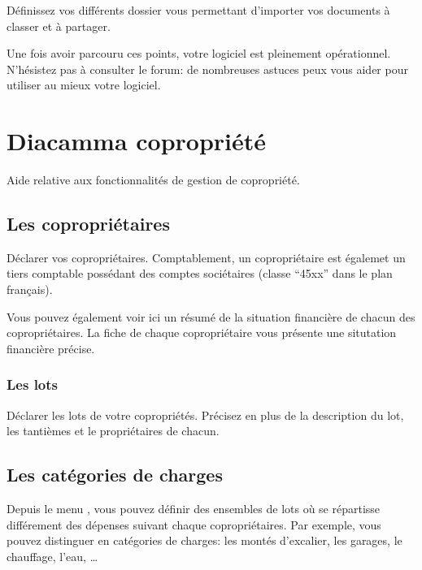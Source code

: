 \documentclass[a4paper,10pt,oneside,french]{sphinxmanual}
\begin{document}
Définissez vos différents dossier vous permettant d’importer vos documents à classer et à partager.

Une fois avoir parcouru ces points, votre logiciel  est pleinement opérationnel.
N’hésistez pas à consulter le forum: de nombreuses astuces peux vous aider pour utiliser au mieux votre logiciel.


\chapter{Diacamma copropriété}
\label{\detokenize{condominium/index:diacamma-copropriete}}\label{\detokenize{condominium/index::doc}}
Aide relative aux fonctionnalités de gestion de copropriété.


\section{Les copropriétaires}
\label{\detokenize{condominium/owners:les-coproprietaires}}\label{\detokenize{condominium/owners::doc}}
Déclarer vos copropriétaires.
Comptablement, un copropriétaire est égalemet un tiers comptable possédant des comptes sociétaires (classe “45xx” dans le plan français).

Vous pouvez également voir ici un résumé de la situation financière de chacun des copropriétaires.
La fiche de chaque copropriétaire vous présente une situtation financière précise.


\subsection{Les lots}
\label{\detokenize{condominium/owners:les-lots}}
Déclarer les lots de votre copropriétés.
Précisez en plus de la description du lot, les tantièmes et le propriétaires de chacun.
\begin{quote}

\noindent{}
\end{quote}


\section{Les catégories de charges}
\label{\detokenize{condominium/classloads:les-categories-de-charges}}\label{\detokenize{condominium/classloads::doc}}
Depuis le menu , vous pouvez définir des ensembles de lots où se répartisse différement des dépenses suivant chaque copropriétaires.
Par exemple, vous pouvez distinguer en catégories de charges: les montés d’excalier, les garages, le chauffage, l’eau, …
\end{document}
